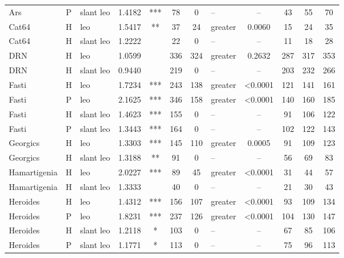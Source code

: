 \documentclass[twocolumn, switch]{article} %
\begin{document}
\begin{table}[h!]
\begin{tabular}{lclcccclcc@{\hspace{1\tabcolsep}}c@{\hspace{1\tabcolsep}}c}
           Ars &     P &  slant leo & 1.4182 &   *** &   78 &         0 &        -- & -- &   43 &   55 &   70 \\
         Cat64 &     H &        leo & 1.5417 &    ** &   37 &        24 &     greater & 0.0060 &   15 &   24 &   35 \\
         Cat64 &     H &  slant leo & 1.2222 &       &   22 &         0 &        -- & -- &   11 &   18 &   28 \\
           DRN &     H &        leo & 1.0599 &       &  336 &       324 &     greater & 0.2632 &  287 &  317 &  353 \\
           DRN &     H &  slant leo & 0.9440 &       &  219 &         0 &        -- & -- &  203 &  232 &  266 \\
         Fasti &     H &        leo & 1.7234 &   *** &  243 &       138 &     greater & <0.0001 &  121 &  141 &  161 \\
         Fasti &     P &        leo & 2.1625 &   *** &  346 &       158 &     greater & <0.0001 &  140 &  160 &  185 \\
         Fasti &     H &  slant leo & 1.4623 &   *** &  155 &         0 &        -- & -- &   91 &  106 &  122 \\
         Fasti &     P &  slant leo & 1.3443 &   *** &  164 &         0 &        -- & -- &  102 &  122 &  143 \\
      Georgics &     H &        leo & 1.3303 &   *** &  145 &       110 &     greater & 0.0005 &   91 &  109 &  123 \\
      Georgics &     H &  slant leo & 1.3188 &    ** &   91 &         0 &        -- & -- &   56 &   69 &   83 \\
  Hamartigenia &     H &        leo & 2.0227 &   *** &   89 &        45 &     greater & <0.0001 &   31 &   44 &   57 \\
  Hamartigenia &     H &  slant leo & 1.3333 &       &   40 &         0 &        -- & -- &   21 &   30 &   43 \\
      Heroides &     H &        leo & 1.4312 &   *** &  156 &       107 &     greater & <0.0001 &   93 &  109 &  134 \\
      Heroides &     P &        leo & 1.8231 &   *** &  237 &       126 &     greater & <0.0001 &  104 &  130 &  147 \\
      Heroides &     H &  slant leo & 1.2118 &     * &  103 &         0 &        -- & -- &   67 &   85 &  106 \\
      Heroides &     P &  slant leo & 1.1771 &     * &  113 &         0 &        -- & -- &   75 &   96 &  113 \\

\end{tabular}
\end{table}
\end{document}
